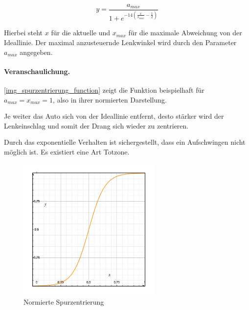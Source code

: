 \documentclass[a4paper,12pt]{report}
\begin{document}
		\[y=\frac{a_{max}}{1 + e^{-14\left( \frac{x}{x_{max}} - \frac{1}{2} \right)}}\]
	
	Hierbei steht $x$ für die aktuelle und $x_{max}$ für die maximale Abweichung von der Ideallinie.
	Der maximal anzusteuernde Lenkwinkel wird durch den Parameter $a_{max}$ angegeben.
	
	\paragraph{Veranschaulichung.} \autoref{img_spurzentrierung_function} zeigt die Funktion beispielhaft für $a_{max} = x_{max} = 1$, also in ihrer normierten Darstellung.
	
	Je weiter das Auto sich von der Ideallinie entfernt, desto stärker wird der Lenkeinschlag und somit der Drang sich wieder zu zentrieren.
	
	Durch das exponentielle Verhalten ist sichergestellt, dass ein Aufschwingen nicht möglich ist. Es existiert eine Art Totzone.
	
	\begin{figure}[ht]
		\centering
		\includegraphics[width=200pt,keepaspectratio]{assets/spurzentrierung}
		\caption{Normierte Spurzentrierung}
		\label{img_spurzentrierung_function}
	\end{figure}
	
	
\end{document}
